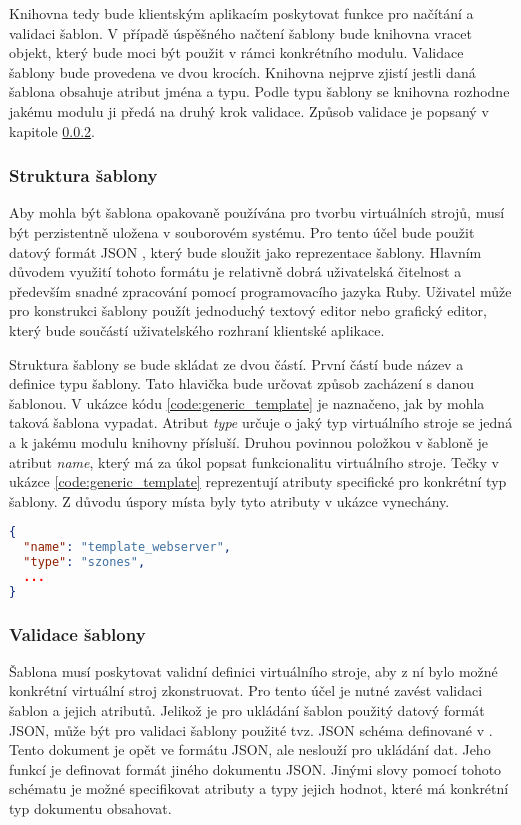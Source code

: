 Knihovna tedy bude klientským aplikacím poskytovat funkce pro načítání a validaci šablon. V případě úspěšného načtení šablony
bude knihovna vracet objekt, který bude moci být použit v rámci konkrétního modulu. Validace šablony bude provedena ve dvou
krocích. Knihovna nejprve zjistí jestli daná šablona obsahuje atribut jména a typu. Podle typu šablony se knihovna rozhodne
jakému modulu ji předá na druhý krok validace. Způsob validace je popsaný v kapitole \ref{chapter:implementation:library:generic:validation}.
\subsubsection{Struktura šablony}
\label{chapter:implementation:library:generic:structure}
Aby mohla být šablona opakovaně používána pro tvorbu virtuálních strojů, musí být perzistentně uložena v souborovém systému.
Pro tento účel bude použit datový formát JSON \cite{json}, který bude sloužit jako reprezentace šablony. Hlavním důvodem využití tohoto
formátu je relativně dobrá uživatelská čitelnost a především snadné zpracování pomocí programovacího jazyka Ruby. Uživatel
může pro konstrukci šablony použít jednoduchý textový editor nebo grafický editor, který bude součástí uživatelského rozhraní
klientské aplikace. 

Struktura šablony se bude skládat ze dvou částí. První částí bude název a definice typu šablony. Tato hlavička bude určovat
způsob zacházení s danou šablonou. V ukázce kódu \ref{code:generic_template} je naznačeno, jak by mohla taková šablona vypadat.
Atribut \textit{type} určuje o jaký typ virtuálního stroje se jedná a k jakému modulu knihovny přísluší. Druhou povinnou položkou
v šabloně je atribut \textit{name}, který má za úkol popsat funkcionalitu virtuálního stroje. Tečky v ukázce
\ref{code:generic_template} reprezentují atributy specifické pro konkrétní typ šablony. Z důvodu úspory místa byly tyto atributy
v ukázce vynechány.
\begin{lstlisting}[language=json, caption={Generická šablona}, float,label={code:generic_template}]  
{
  "name": "template_webserver",
  "type": "szones",
  ...
}
\end{lstlisting}
\subsubsection{Validace šablony}
\label{chapter:implementation:library:generic:validation}
Šablona musí poskytovat validní definici virtuálního stroje, aby z ní bylo možné konkrétní virtuální stroj zkonstruovat.
Pro tento účel je nutné zavést validaci šablon a jejich atributů. Jelikož je pro ukládání šablon použitý datový formát JSON,
může být pro validaci šablony použité tvz. JSON schéma definované v \cite{json:schema}. Tento dokument je opět ve formátu
JSON, ale neslouží pro ukládání dat. Jeho funkcí je definovat formát jiného dokumentu JSON. Jinými slovy pomocí tohoto schématu
je možné specifikovat atributy a typy jejich hodnot, které má konkrétní typ dokumentu obsahovat.

